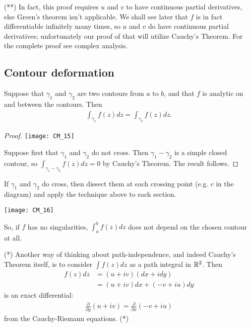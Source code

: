 \documentclass[a4paper]{article}
\begin{document}
(**) In fact, this proof requires $u$ and $v$ to have continuous partial derivatives, else Green's theorem isn't applicable. We shall see later that $f$ is in fact differentiable infinitely many times, so $u$ and $v$ do have continuous partial derivatives; unfortunately our proof of that will utilize Cauchy's Theorem. For the complete proof see complex analysis.

\subsection{Contour deformation}
Suppose that $\gamma_1$ and $\gamma_2$ are two contours from $a$ to $b$, and that $f$ is analytic on and between the contours. Then
\begin{equation*}
\begin{aligned}
\int_{\gamma_1} f(z) dz = \int_{\gamma_2} f(z) dz.
\end{aligned}
\end{equation*}
\begin{proof}

\texttt{[image: CM\_15]}

Suppose first that $\gamma_1$ and $\gamma_2$ do not cross. Then $\gamma_1-\gamma_2$ is a simple closed contour, so $\int_{\gamma_1-\gamma_2} f(z) dz = 0$ by Cauchy's Theorem. The result follows.

\end{proof}

If $\gamma_1$ and $\gamma_2$ do cross, then dissect them at each crossing point (e.g. $c$ in the diagram) and apply the technique above to each section.

\texttt{[image: CM\_16]}

So, if $f$ has no singularities, $\int_a^b f(z) dz$ does not depend on the chosen contour at all.

(*) Another way of thinking about path-independence, and indeed Cauchy's Theorem itself, is to consider $\int f(z)dz$ as a path integral in $\mathbb{R}^2$. Then
\begin{equation*}
\begin{aligned}
f(z)dz &= (u+iv)(dx+idy)\\
&= (u+iv)dx + (-v+iu)dy
\end{aligned}
\end{equation*}
is an exact differential:
\begin{equation*}
\begin{aligned}
\frac{\partial}{\partial y} (u+iv) = \frac{\partial}{\partial x}(-v+iu)
\end{aligned}
\end{equation*}
from the Cauchy-Riemann equations. (*)
\end{document}
